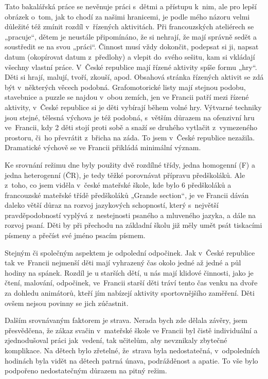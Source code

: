 		Tato bakalářská práce se nevěnuje práci s dětmi a přístupu k nim, ale pro lepší obrázek o tom, jak to chodí za našimi hranicemi, je podle mého názoru velmi důležité též zmínit rozdíl v řízených aktivitách. Při francouzských ateliérech se „pracuje“, dětem je neustále připomínáno, že si nehrají, že mají správně sedět a soustředit se na svou „práci“. Činnost musí vždy dokončit, podepsat si ji, napsat datum (okopírovat datum z předlohy) a vlepit do svého sešitu, kam si vkládají všechny vlastní práce. V České republice mají řízené aktivity spíše formu „hry“. Děti si hrají, malují, tvoří, zkouší, apod. 
		Obsahová stránka řízených aktivit se zdá být v některých věcech podobná. Grafomotorické listy mají stejnou podobu, stavebnice a puzzle se najdou v obou zemích, jen ve Francii patří mezi řízené aktivity, v České republice si je děti vybírají během volné hry. Výtvarné techniky jsou stejné, tělesná výchova je též podobná, s větším důrazem na ofenzivní hru ve Francii, kdy 2 děti stojí proti sobě a snaží se druhého vytlačit z vymezeného prostoru, či ho převrátit z břicha na záda. To jsem v České republice nezažila. Dramatické výchově se ve Francii přikládá minimální význam. 

		Ke srovnání režimu dne byly použity dvě rozdílné třídy, jedna homogenní (F) a jedna heterogenní (ČR), je tedy těžké porovnávat přípravu předškoláků. Ale z toho, co jsem viděla v české mateřské škole, kde bylo 6 předškoláků a francouzské mateřské třídě předškoláků „Grande section“, je ve Francii dáván daleko větší důraz na rozvoj jazykových schopností, který s největší pravděpodobností vyplývá z nestejnosti psaného a mluveného jazyka, a dále na rozvoj psaní. Děti by při přechodu na základní školu již měly umět psát tiskacími písmeny a přečíst své jméno psacím písmem. 

		Stejným či společným aspektem je odpolední odpočinek. Jak v České republice tak ve Francii nejmenší děti mají vyhrazený čas okolo jedné až jedné a půl hodiny na spánek. Rozdíl je u starších dětí, u nás mají klidové činnosti, jako je čtení, malování, odpočinek, ve Francii starší děti tráví tento čas venku na dvoře za dohledu animátorů, kteří jím nabízejí aktivity sportovnějšího zaměření. Děti ovšem nejsou povinny se jich zúčastnit.

		Dalším srovnávaným faktorem je strava. Nerada bych zde dělala závěry, jsem přesvědčena, že zákaz svačin v mateřské škole ve Francii byl čistě individuální a zjednodušoval práci jak vedení, tak učitelům, aby nevznikaly zbytečné komplikace. Na dětech bylo zřetelné, že strava byla nedostatečná, v odpoledních hodinách byla vidět na dětech patrná únava, podrážděnost a apatie. To vše bylo podpořeno nedostatečným důrazem na pitný režim.

